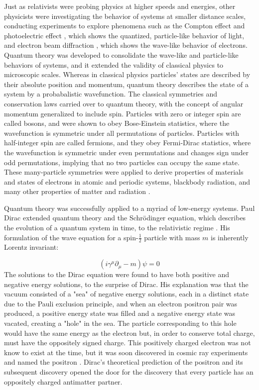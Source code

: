 \indent Just as relativists were probing physics at higher speeds and energies, other physicists were investigating the behavior of systems at smaller distance scales, conducting experiments to explore phenomena such as the Compton effect \cite{PhysRev.21.483} and photoelectric effect \cite{Einstein:1905cc}, which shows the quantized, particle-like behavior of light, and electron beam diffraction \cite{Davisson:1927ta}, which shows the wave-like behavior of electrons. Quantum theory was developed to consolidate the wave-like and particle-like behaviors of systems, and it extended the validity of classical physics to microscopic scales. Whereas in classical physics particles' states are described by their absolute position and momentum, quantum theory describes the state of a system by a probabalistic wavefunction. The classical symmetries and conservation laws carried over to quantum theory, with the concept of angular momentum generalized to include spin. Particles with zero or integer spin are called bosons, and were shown to obey Bose-Einstein statistics, where the wavefunction is symmetric under all permutations of particles. Particles with half-integer spin are called fermions, and they obey Fermi-Dirac statistics, where the wavefunction is symmetric under even permutations and changes sign under odd permutations, implying that no two particles can occupy the same state. These many-particle symmetries were applied to derive properties of materials and states of electrons in atomic and periodic systems, blackbody radiation, and many other properties of matter and radiation \cite{Shankar}.

\indent Quantum theory was successfully applied to a myriad of low-energy systems. Paul Dirac extended quantum theory and the Schr\"odinger equation, which describes the evolution of a quantum system in time, to the relativistic regime \cite{Diracqm}. His formulation of the wave equation for a spin-$\frac{1}{2}$ particle with mass $m$ is inherently Lorentz invariant:

\begin{equation}
(i \gamma^\mu \partial_\mu - m)\psi = 0
\end{equation}
The solutions to the Dirac equation were found to have both positive and negative energy solutions, to the surprise of Dirac. His explanation was that the vacuum consisted of a "sea" of negative energy solutions, each in a distinct state due to the Pauli exclusion principle, and when an electron positron pair was produced, a positive energy state was filled and a negative energy state was vacated, creating a "hole" in the sea. The particle corresponding to this hole would have the same energy as the electron but, in order to conserve total charge, must have the oppositely signed charge. This positively charged electron was not know to exist at the time, but it was soon discovered in cosmic ray experiments and named the positron \cite{PhysRev.43.491}. Dirac's theoretical prediction of the positron and its subsequent discovery opened the door for the discovery that every particle has an oppositely charged antimatter partner. 

